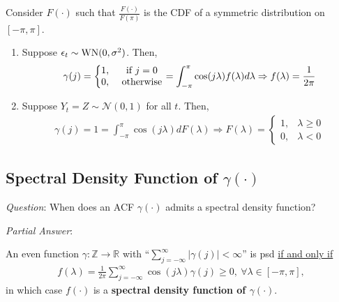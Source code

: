 \documentclass[11pt]{elegantbook}
\begin{document}
\begin{example}
    Consider $F(\cdot)$ such that $\frac{F(\cdot)}{F(\pi)}$ is the CDF of a symmetric distribution on $[-\pi, \pi]$.
    \begin{enumerate}
        \item Suppose $\epsilon_t\sim \textnormal{WN}(0,\sigma^2)$. Then,
        \begin{equation}
            \begin{aligned}
                \gamma(j)=\left\{\begin{matrix}
                    1,&\textnormal{ if }j=0\\
                    0,&\textnormal{ otherwise}
                \end{matrix}\right.=\int_{-\pi}^\pi \cos(j\lambda)f(\lambda) d \lambda\Rightarrow f(\lambda)=\frac{1}{2\pi}
            \end{aligned}
            \nonumber
        \end{equation}
        \item Suppose $Y_t=Z\sim \mathcal{N}(0,1)$ for all $t$. Then,
        \begin{equation}
            \begin{aligned}
                \gamma(j)=1=\int_{-\pi}^\pi \cos(j\lambda) d F(\lambda)\Rightarrow F(\lambda)=
                \left\{\begin{matrix}
                    1,&\lambda\geq 0\\
                    0,&\lambda<0
                \end{matrix}\right.
            \end{aligned}
            \nonumber
        \end{equation}
    \end{enumerate}
\end{example}

\subsection{Spectral Density Function of $\gamma(\cdot)$}
\textit{Question}: When does an ACF $\gamma(\cdot)$ admits a spectral density function?

\textit{Partial Answer}:
\begin{proposition}
    An even function $\gamma: \mathbb{Z}\rightarrow \mathbb{R}$ with ``$\sum_{j=-\infty}^\infty |\gamma(j)|<\infty$'' is psd \underline{if and only if}
    \begin{equation}
        \begin{aligned}
            f(\lambda)=\frac{1}{2\pi}\sum_{j=-\infty}^\infty \cos\left(j\lambda\right)\gamma(j)\geq 0,\ \forall \lambda\in[-\pi, \pi],
        \end{aligned}
        \label{eq:partial_answer}
    \end{equation}
    in which case $f(\cdot)$ is a \textbf{spectral density function of $\gamma(\cdot)$}.
\end{proposition}
\end{document}
